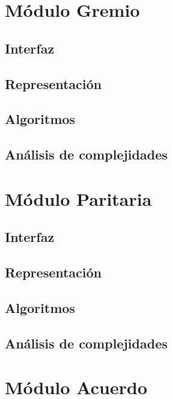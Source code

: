 \documentclass[10pt, a4paper]{article}
\begin{document}
\maketitle
\tableofcontents
\newpage

\section{Módulo Gremio} 
\subsection{Interfaz}

\subsection{Representaci\'on}

\subsection{Algoritmos}

\subsection{Análisis de complejidades}

\newpage

\section{Módulo Paritaria} 
\subsection{Interfaz}

\subsection{Representaci\'on}

\subsection{Algoritmos}

\subsection{Análisis de complejidades}

\newpage

\section{Módulo Acuerdo} 
\end{document}
